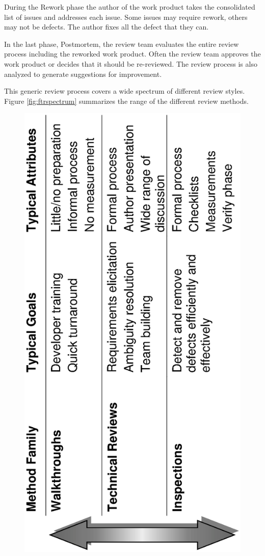 During the Rework phase the author of the work product takes the consolidated
list of issues and addresses each issue.  Some issues may require rework,
others may not be defects.  The author fixes all the defect that they can.

In the last phase, Postmortem, the review team evaluates the entire review
process including the reworked work product.  Often the review team approves the 
work product or decides that it should be re-reviewed.  The review process is
also analyzed to generate suggestions for improvement.

This generic review process covers a wide spectrum of different review styles.
Figure \ref{fig:ftrspectrum} summarizes the range of the different review
methods.

\begin{figure}[htbp]
  \centering
  \includegraphics[angle=270,width=6in,bb=120 60 450 720]{FTR-spectrum.ps}

\end{figure}
